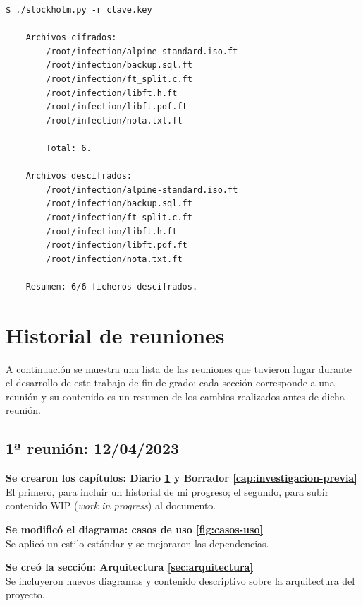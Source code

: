                 \begin{lstlisting}[style=bash_style, basicstyle=\ttfamily\scriptsize, caption={Fragmento de la salida del proyecto \texttt{stockholm}.}]
    $ ./stockholm.py -r clave.key

    Archivos cifrados:
        /root/infection/alpine-standard.iso.ft
        /root/infection/backup.sql.ft
        /root/infection/ft_split.c.ft
        /root/infection/libft.h.ft
        /root/infection/libft.pdf.ft
        /root/infection/nota.txt.ft

        Total: 6.

    Archivos descifrados:
        /root/infection/alpine-standard.iso.ft
        /root/infection/backup.sql.ft
        /root/infection/ft_split.c.ft
        /root/infection/libft.h.ft
        /root/infection/libft.pdf.ft
        /root/infection/nota.txt.ft

    Resumen: 6/6 ficheros descifrados.
                \end{lstlisting}

                \cleardoublepage


\chapter{Historial de reuniones}
    \label{cap:diario}

    A continuación se muestra una lista de las reuniones que tuvieron lugar durante el desarrollo de este trabajo de fin de grado: cada sección corresponde a una reunión y su contenido es un resumen de los cambios realizados antes de dicha reunión.

    \section{1ª reunión: 12/04/2023}
    
        \textbf{Se crearon los capítulos: Diario \ref{cap:diario} y Borrador \ref{cap:investigacion-previa}} \\
        El primero, para incluir un historial de mi progreso; el segundo, para subir contenido WIP (\textit{work in progress}) al documento.
        
        \textbf{Se modificó el diagrama: casos de uso \ref{fig:casos-uso}} \\
        Se aplicó un estilo estándar y se mejoraron las dependencias.
        
        \textbf{Se creó la sección: Arquitectura \ref{sec:arquitectura}} \\
        Se incluyeron nuevos diagramas y contenido descriptivo sobre la arquitectura del proyecto.
        
